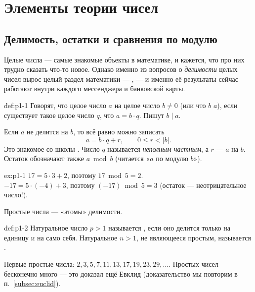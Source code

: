 
\section{Элементы теории чисел}
\label{sec:numtheory}

\subsection{Делимость, остатки и сравнения по модулю}

Целые числа --- самые знакомые объекты в математике, и кажется, что про них трудно сказать что-то новое. Однако именно из вопросов о \emph{делимости} целых чисел вырос целый раздел математики --- , --- и именно её результаты сейчас работают внутри каждого мессенджера и банковской карты.

\begin{definition}{}{def:p1-1}
Говорят, что целое число $a$  на целое число $b \neq 0$ (или что $b$  $a$), если существует такое целое число $q$, что $a = b\cdot q$. Пишут $b \mid a$.
\end{definition}

Если $a$ не делится на $b$, то всё равно можно записать
\[
a = b\cdot q + r, \qquad 0 \le r < |b|.
\]
Это знакомое со школы . Число $q$ называется \emph{неполным частным}, а $r$ ---  $a$ на $b$. Остаток обозначают также $a \bmod b$ (читается «$a$ по модулю $b$»).

\begin{example}{}{ex:p1-1}
$17 = 5\cdot 3 + 2$, поэтому $17 \bmod 5 = 2$.\\
$-17 = 5\cdot(-4) + 3$, поэтому $(-17)\bmod 5 = 3$ (остаток --- неотрицательное число!).
\end{example}

Простые числа --- «атомы» делимости.

\begin{definition}{}{def:p1-2}
Натуральное число $p > 1$ называется , если оно делится только на единицу и на само себя. Натуральное $n > 1$, не являющееся простым, называется .
\end{definition}

Первые простые числа: $2, 3, 5, 7, 11, 13, 17, 19, 23, 29, \ldots$. Простых чисел бесконечно много --- это доказал ещё Евклид (доказательство мы повторим в п.~\ref{subsec:euclid}).

